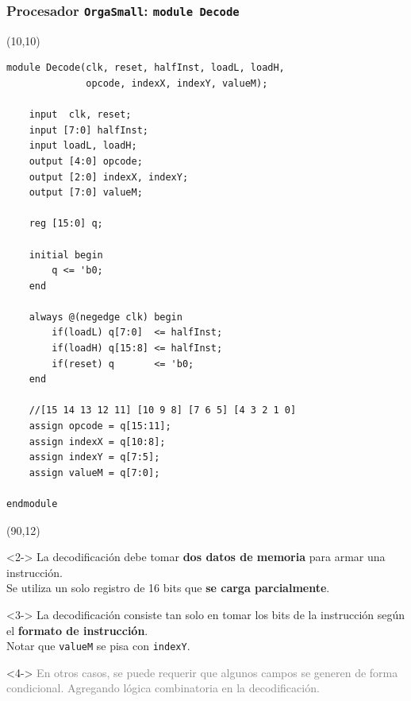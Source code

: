 \documentclass[aspectratio=169]{beamer}
\begin{document}
\begin{frame}[fragile,t]
    \frametitle{Procesador \texttt{OrgaSmall}: \texttt{module Decode}}
    \begin{textblock}{70}(10,10)
\lstset{basicstyle=\tiny}
\begin{lstlisting}
module Decode(clk, reset, halfInst, loadL, loadH,
              opcode, indexX, indexY, valueM);

    input  clk, reset;
    input [7:0] halfInst;
    input loadL, loadH;
    output [4:0] opcode;
    output [2:0] indexX, indexY;
    output [7:0] valueM;
    
    reg [15:0] q;
    
    initial begin
        q <= 'b0;
    end
    
    always @(negedge clk) begin
        if(loadL) q[7:0]  <= halfInst;
        if(loadH) q[15:8] <= halfInst;
        if(reset) q       <= 'b0;
    end

    //[15 14 13 12 11] [10 9 8] [7 6 5] [4 3 2 1 0]
    assign opcode = q[15:11];
    assign indexX = q[10:8];
    assign indexY = q[7:5];
    assign valueM = q[7:0];
    
endmodule
\end{lstlisting}
    \end{textblock}
    \begin{textblock}{55}(90,12)
    \small
    \begin{onlyenv}<2->
    La decodificación debe tomar \textbf{dos datos de memoria} para armar una instrucción.\\
    \bigskip
    Se utiliza un solo registro de 16 bits que \textbf{se carga parcialmente}.\\
    \end{onlyenv}
    \bigskip
    \begin{onlyenv}<3->
    La decodificación consiste tan solo en tomar los bits de la instrucción según el \textbf{formato de instrucción}.\\
    \bigskip
    \textcolor{verdeuca}{Notar que \texttt{valueM} se pisa con \texttt{indexY}.}\\
    \end{onlyenv}
    \bigskip
    \begin{onlyenv}<4->
    \textcolor{gray}{
    En otros casos, se puede requerir que algunos campos se generen de forma condicional. Agregando lógica combinatoria en la decodificación.}
    \end{onlyenv}
    \end{textblock}
\end{frame}
\end{document}
